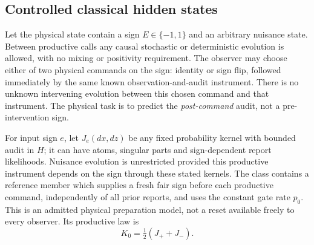 \subsection*{Controlled classical hidden states}
Let the physical state contain a sign $E\in\{-1,1\}$ and an arbitrary nuisance state. Between productive calls any causal stochastic or deterministic evolution is allowed, with no mixing or positivity requirement. The observer may choose either of two physical commands on the sign: identity or sign flip, followed immediately by the same known observation-and-audit instrument. There is no unknown intervening evolution between this chosen command and that instrument. The physical task is to predict the \emph{post-command} audit, not a pre-intervention sign.

For input sign $e$, let $J_e(dx,dz)$ be any fixed probability kernel with bounded audit in $H$; it can have atoms, singular parts and sign-dependent report likelihoods. Nuisance evolution is unrestricted provided this productive instrument depends on the sign through these stated kernels. The class contains a reference member which supplies a fresh fair sign before each productive command, independently of all prior reports, and uses the constant gate rate $p_0$. This is an admitted physical preparation model, not a reset available freely to every observer. Its productive law is
\begin{equation}\label{eq:classical-ref}
 K_0=\tfrac12(J_++J_-).
\end{equation}

